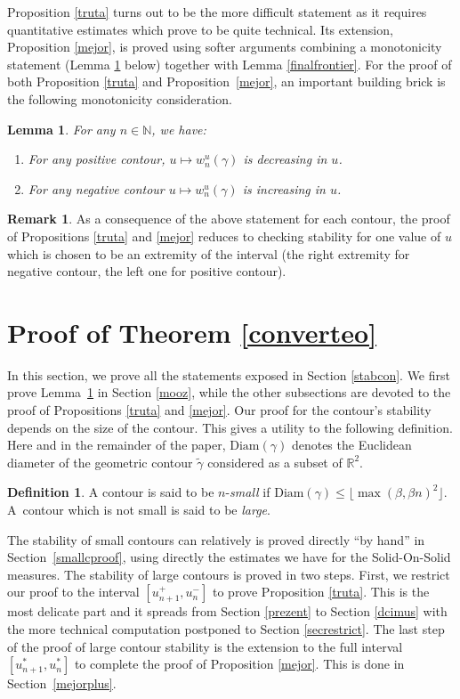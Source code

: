 \documentclass[JEP,XML,SOM,Unicode, NoFloatCountersInSection]{cedram}
\newenvironment{enumeratei}
{\bgroup\def\theenumi{\roman{enumi}}\def\theenumii{\Alph{enumii}}\begin{enumerate}}
{\end{enumerate}\egroup}
\numberwithin{equation}{section}
\theoremstyle{plain}
\newtheorem{lemma}[theorem]{Lemma}
\theoremstyle{definition}
\newtheorem{rem}[theorem]{Remark}
\newtheorem{definition}[theorem]{Definition}
\newcommand{\Diam}{\mathrm{Diam}}
\newcommand{\bbN}{{\ensuremath{\mathbb N}} }
\newcommand{\bbR}{{\ensuremath{\mathbb R}} }
\newcommand{\gb}{\beta}
\begin{document}
Proposition \ref{truta} turns out to be the more difficult statement as it requires quantitative estimates which prove to be quite technical.
Its extension, Proposition \ref{mejor}, is proved using softer arguments
combining a monotonicity statement (Lemma \ref{mozon} below) together with Lemma \ref{finalfrontier}.
For the proof of both Proposition \ref{truta} and Proposition~\ref{mejor}, an important building brick is the following monotonicity consideration.
\begin{lemma}\label{mozon}
For any $n\in \bbN$, we have:
\begin{enumeratei}
\item
For any positive contour, $u\mapsto w^u_n(\gamma)$ is decreasing in $u$.
\item
For any negative contour $u\mapsto w^u_n(\gamma)$ is increasing in $u$.
\end{enumeratei}
\end{lemma}
\begin{rem} \label{mouton}
As a consequence of the above statement for each contour, the proof of Propositions \ref{truta} and \ref{mejor} reduces to checking
stability for one value of $u$ which is chosen to be an extremity of the interval (the right extremity for negative contour, the left one for positive contour).
\end{rem}

\section{Proof of Theorem \ref{converteo}}\label{ponverteo}

In this section, we prove all the statements exposed in Section \ref{stabcon}.
We first prove Lemma~\ref{mozon} in Section \ref{mooz}, while the other subsections are devoted to the proof of Propositions \ref{truta} and \ref{mejor}.
Our proof for the contour's stability depends on the size of the contour.
This gives a utility to the following definition.
Here and in the remainder of the paper, $\Diam(\gamma)$ denotes the Euclidean diameter of the geometric contour $\tilde \gamma$ considered as a subset of $\bbR^2$.

\begin{definition}
A contour is said to be $n$-\textit{small} if $\Diam(\gamma)\le \lfloor \max(\gb,\gb n)^2 \rfloor$.
A~contour which is not small is said to be \textit{large}.
\end{definition}

The stability of small contours can relatively is proved directly ``by hand'' in Section~\ref{smallcproof}, using directly the estimates we have for the Solid-On-Solid measures.
The stability of large contours is proved in two steps. First, we restrict our proof to the interval $[u^{+}_{n+1},u^{-}_n]$ to prove Proposition \ref{truta}.
This is the most delicate part and it spreads from Section \ref{prezent} to Section \ref{dcimus} with the more technical computation postponed to Section
\ref{secrestrict}.
The last step of the proof of large contour stability is the extension to the full interval $[u^{*}_{n+1},u^{*}_n]$ to complete the proof of Proposition \ref{mejor}. This is done in Section~\ref{mejorplus}.
\end{document}
